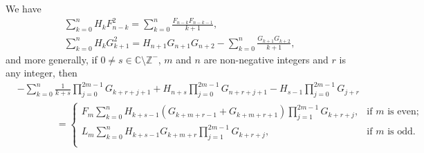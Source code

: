 \documentclass[12pt,reqno]{article}
\begin{document}
	\begin{theorem}
		We have
		\begin{gather}
		\sum_{k = 0}^n {H_k F_{n - k}^2 } = \sum_{k = 0}^n {\frac{{F_{n - k} F_{n - k - 1} }}{{k + 1}}},\\
		\sum_{k = 0}^n {H_k G_{k + 1}^2 } = H_{n + 1} G_{n + 1} G_{n + 2} - \sum_{k = 0}^n {\frac{{G_{k + 1} G_{k + 2} }}{{k + 1}}},
		\end{gather}
		and more generally, if $0\ne s\in\mathbb C\setminus\mathbb Z^{-}$, $m$ and $n$ are non-negative integers and $r$ is any integer, then
		\begin{equation}\label{eq.g8er2qv}
		\begin{split}
		& - \sum_{k = 0}^n {\frac{1}{{k + s}}\prod_{j = 0}^{2m - 1} {G_{k + r + j + 1} } } + H_{n + s} \prod_{j = 0}^{2m - 1} {G_{n + r + j + 1} }  - H_{s - 1} \prod_{j = 0}^{2m - 1} {G_{j + r} } \\
		&\qquad\qquad =
		\begin{cases}
		F_m \sum_{k = 0}^n {H_{k + s - 1} \left( {G_{k + m + r - 1}  + G_{k + m + r + 1} } \right)\prod_{j = 1}^{2m - 1} {G_{k + r + j} } },&\text{if $m$ is even;}  \\
		L_m \sum_{k = 0}^n {H_{k + s - 1} G_{k + m + r} \prod_{j = 1}^{2m - 1} {G_{k + r + j} } },&\text{if $m$ is odd.}  \\
		\end{cases}
		\end{split}
		\end{equation}
	\end{theorem}
\end{document}
